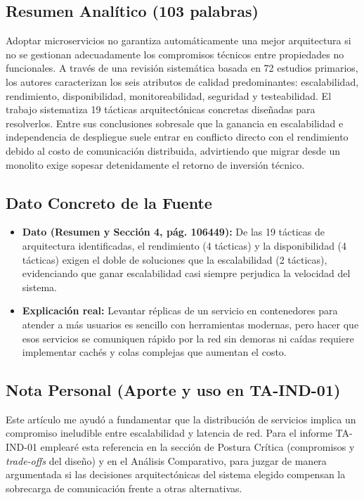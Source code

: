 \documentclass[11pt,a4paper]{article}
\begin{document}
\subsection*{Resumen Analítico (103 palabras)}
Adoptar microservicios no garantiza automáticamente una mejor arquitectura si no se gestionan adecuadamente los compromisos técnicos entre propiedades no funcionales. A través de una revisión sistemática basada en 72 estudios primarios, los autores caracterizan los seis atributos de calidad predominantes: escalabilidad, rendimiento, disponibilidad, monitoreabilidad, seguridad y testeabilidad. El trabajo sistematiza 19 tácticas arquitectónicas concretas diseñadas para resolverlos. Entre sus conclusiones sobresale que la ganancia en escalabilidad e independencia de despliegue suele entrar en conflicto directo con el rendimiento debido al costo de comunicación distribuida, advirtiendo que migrar desde un monolito exige sopesar detenidamente el retorno de inversión técnico.

\subsection*{Dato Concreto de la Fuente}
\begin{itemize}[leftmargin=1.2em]
    \item \textbf{Dato (Resumen y Sección 4, pág. 106449):} De las 19 tácticas de arquitectura identificadas, el rendimiento (4 tácticas) y la disponibilidad (4 tácticas) exigen el doble de soluciones que la escalabilidad (2 tácticas), evidenciando que ganar escalabilidad casi siempre perjudica la velocidad del sistema.
    \item \textbf{Explicación real:} Levantar réplicas de un servicio en contenedores para atender a más usuarios es sencillo con herramientas modernas, pero hacer que esos servicios se comuniquen rápido por la red sin demoras ni caídas requiere implementar cachés y colas complejas que aumentan el costo.
\end{itemize}

\subsection*{Nota Personal (Aporte y uso en TA-IND-01)}
Este artículo me ayudó a fundamentar que la distribución de servicios implica un compromiso ineludible entre escalabilidad y latencia de red. Para el informe TA-IND-01 emplearé esta referencia en la sección de Postura Crítica (compromisos y \emph{trade-offs} del diseño) y en el Análisis Comparativo, para juzgar de manera argumentada si las decisiones arquitectónicas del sistema elegido compensan la sobrecarga de comunicación frente a otras alternativas.
\end{document}
